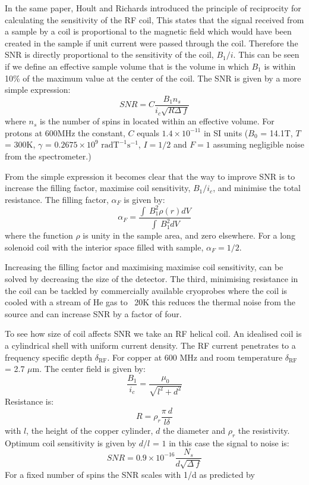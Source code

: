 In the same paper, Hoult and Richards introduced the principle of reciprocity for calculating the
sensitivity of the RF coil, This states that the signal received from a sample by a coil is proportional to the magnetic
field which would have been created in the sample if unit current were passed through the coil. Therefore the SNR is
directly proportional to the sensitivity of the coil, $B_1/i$. This can be seen if we define an
effective sample volume that is the volume in which $B_1$ is within 10\% of the maximum
value at the center of the coil. The SNR is given by a more simple expression\citep{vanBentum:2007fda}:
\begin{equation}
  SNR = C\frac{B_1n_s}{i_c\sqrt{R\Delta~f}}
\end{equation}
where $n_s$ is the number of spins in located within an effective volume.
For protons at 600MHz the constant, $C$ equals $1.4\times10^{-11}$ in SI units ($B_0$ = 14.1T, $T$ = 300K, $\gamma$ =
$0.2675\times10^9$ $\text{rad} \text{T}^{-1}\text{s}^{-1}$, $I = 1/2$ and $F = 1$ assuming negligible noise from the spectrometer.)

From the simple expression it becomes clear that the way to improve SNR is to increase the filling factor, maximise coil sensitivity,
$B_1/i_c$, and minimise the total resistance. The filling factor, $\alpha_F$ is given by:
\begin{equation}\label{eqn:FillingFactor}
  \alpha_F = \frac{\int~B_1^2\rho(r)dV}{\int~B_1^2dV}
\end{equation}
where the function $\rho$ is unity in the sample area, and zero elsewhere. For a long solenoid coil with the
interior space filled with sample, $\alpha_F = 1/2$.

Increasing the filling factor and maximising maximise coil sensitivity, can be solved by decreasing the size of
the detector. The third, minimising resistance in the coil
can be tackled by commercially available cryoprobes where the coil is cooled with a stream of He gas to
~20K this reduces the thermal noise from the source and can increase SNR by a factor of four.

To see how size of coil affects SNR we take an RF helical coil. An idealised coil
is a cylindrical shell with uniform current density. The RF current penetrates to a frequency
specific depth $\delta_{\text{RF}}$. For copper at 600 MHz and room temperature $\delta_{\text{RF}}$ = 2.7 $\mu$m. The center
field is given by:
\begin{equation}
  \frac{B_1}{i_c} = \frac{\mu_0}{\sqrt{l^2+d^2}}
\end{equation}
Resistance is:
\begin{equation}
  R = \rho_r\frac{\pi~d}{l\delta}
\end{equation}
with $l$, the height of the copper cylinder, $d$ the diameter and $\rho_r$ the resistivity.
Optimum coil sensitivity is given by $d/l$ = $1$ in this case the signal to noise is:
\begin{equation}
  SNR = 0.9\times10^{-16}\frac{N_s}{d\sqrt{\Delta~f}}
\end{equation}
For a fixed number of spins the SNR scales with 1/d as predicted by \citep{Hoult:1976dw}

